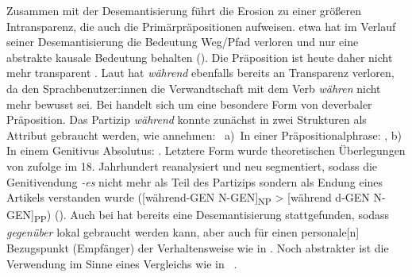 Zusammen mit der Desemantisierung führt die Erosion zu einer größeren Intransparenz, die auch die Primärpräpositionen aufweisen. 
etwa hat im Verlauf seiner Desemantisierung die Bedeutung \glq Weg/Pfad\grq{} verloren und nur eine abstrakte kausale Bedeutung behalten (\cites[s.][219]{Schroder1986}[215]{DiMeola2003}). 
Die Präposition ist heute daher nicht mehr transparent \citep[s.][147]{DiMeola2000}.
Laut \citet[147]{DiMeola2000} hat \textit{w{\"a}hrend }ebenfalls bereits an Transparenz verloren, da den Sprachbenutzer:innen die Verwandtschaft mit dem Verb \textit{w{\"a}hren }nicht mehr bewusst sei.
Bei  handelt sich um eine besondere Form von deverbaler Präposition. 
Das Partizip \textit{w{\"a}hrend }konnte zun{\"a}chst in zwei Strukturen als Attribut gebraucht werden, wie \citet[26]{Lehmann1992} annehmen:~
a)~In einer Pr{\"a}positionalphrase: ,
b) In einem Genitivus Absolutus: .
Letztere Form wurde theoretischen Überlegungen von \citet[26]{Lehmann1992} zufolge im 18. Jahrhundert reanalysiert und neu segmentiert, sodass die Genitivendung \textit{-es }nicht mehr als Teil des Partizips sondern als Endung eines Artikels verstanden wurde ([w{\"a}hrend-GEN N-GEN]\textsubscript{NP} {\textgreater} [w{\"a}hrend d-GEN N-GEN]\textsubscript{PP}) (\cites[s.][26]{Lehmann1992}[vgl. auch][218--219]{Lindqvist1994}). 
Auch bei hat bereits eine Desemantisierung stattgefunden, sodass \textit{gegen{\"u}ber }lokal gebraucht werden kann, aber auch für einen \glqq personale[n] Bezugspunkt (Empfänger) der Verhaltensweise\grqq{} \citep[374]{Helbig.2017} wie in .
Noch abstrakter ist die Verwendung im Sinne eines Vergleichs wie in ~\citep[s.][167]{Eroms1981}. 

